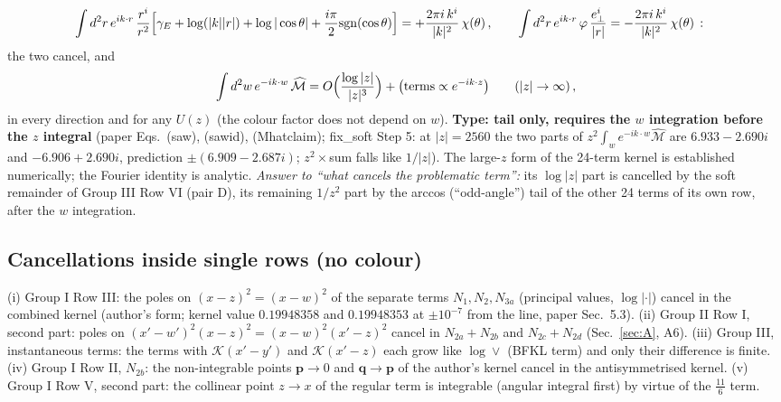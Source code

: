 \begin{align}
\int d^{2}r\,e^{ik\cdot r}\,\frac{r^{i}}{r^{2}}\Big[\gamma_{E}+\log(|k||r|)+\log|\cos\theta|+\frac{i\pi}{2}{\rm sgn}(\cos\theta)\Big]&=+\frac{2\pi i\,k^{i}}{|k|^{2}}\,\chi(\theta)\,,\qquad
\int d^{2}r\,e^{ik\cdot r}\,\varphi\,\frac{e_{\perp}^{i}}{|r|}=-\frac{2\pi i\,k^{i}}{|k|^{2}}\,\chi(\theta)\,:\notag
\end{align}
the two cancel, and
\begin{align}
\int d^{2}w\,e^{-ik\cdot w}\,\widehat{\mathcal{M}}=O\Big(\frac{\log|z|}{|z|^{3}}\Big)+\big(\text{terms}\propto e^{-ik\cdot z}\big)\qquad(|z|\to\infty)\,,\notag
\end{align}
in every direction and for any $U(z)$ (the colour factor does not depend on $w$).
\endgroup
\noindent\textbf{Type: tail only, requires the $w$ integration before the $z$ integral} (paper Eqs.~(saw), (sawid), (Mhatclaim); fix\_soft Step 5: at $|z|=2560$ the two parts of $z^{2}\int_{w}e^{-ik\cdot w}\widehat{\mathcal{M}}$ are $6.933-2.690i$ and $-6.906+2.690i$, prediction $\pm(6.909-2.687i)$; $z^{2}\times$sum falls like $1/|z|$). The large-$z$ form of the 24-term kernel is established numerically; the Fourier identity is analytic. \emph{Answer to ``what cancels the problematic term'':} its $\log|z|$ part is cancelled by the soft remainder of Group III Row VI (pair D), its remaining $1/z^{2}$ part by the arccos (``odd-angle'') tail of the other 24 terms of its own row, after the $w$ integration.

\subsection{Cancellations inside single rows (no colour)}\label{sec:C5}
(i) Group I Row III: the poles on $(x-z)^{2}=(x-w)^{2}$ of the separate terms $N_{1},N_{2},N_{3a}$ (principal values, $\log|\cdot|$) cancel in the combined kernel (author's form; kernel value $0.19948358$ and $0.19948353$ at $\pm10^{-7}$ from the line, paper Sec.~5.3). (ii) Group II Row I, second part: poles on $(x'-w')^{2}(x-z)^{2}=(x-w)^{2}(x'-z)^{2}$ cancel in $N_{2a}+N_{2b}$ and $N_{2c}+N_{2d}$ (Sec.~\ref{sec:A}, A6). (iii) Group III, instantaneous terms: the terms with $\mathcal{K}(x'-y')$ and $\mathcal{K}(x'-z)$ each grow like $\log\vee$ (BFKL term) and only their difference is finite. (iv) Group I Row II, $N_{2b}$: the non-integrable points $\mathbf{p}\to0$ and $\mathbf{q}\to\mathbf{p}$ of the author's kernel cancel in the antisymmetrised kernel. (v) Group I Row V, second part: the collinear point $z\to x$ of the regular term is integrable (angular integral first) by virtue of the $\frac{11}{6}$ term.


